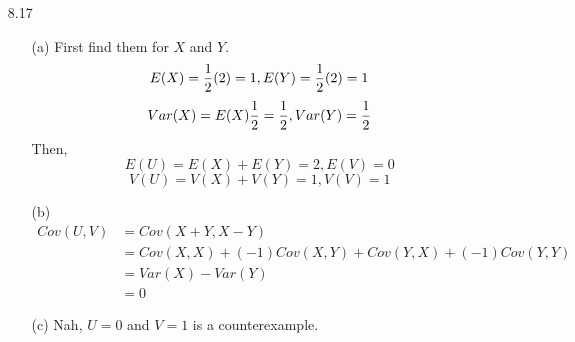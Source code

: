 \documentclass[english, 11pt]{article}
\begin{document}
\begin{itemize}
  \item[8.17]
  \begin{itemize}
    \item[(a)] First find them for $X$ and $Y$.
    \[ E(X) = \frac{1}{2}(2) = 1,  E(Y) = \frac{1}{2}(2) = 1\]
    \[ Var(X) = E(X)\frac{1}{2} = \frac{1}{2}, Var(Y) = \frac{1}{2} \]
    Then,
    \[ E(U) = E(X) + E(Y) = 2, E(V) = 0 \]
    \[ V(U) = V(X) + V(Y) = 1, V(V) = 1 \]
    \item[(b)]
    \begin{align*}
      Cov(U,V) & = Cov(X+Y, X-Y) \\
               & = Cov(X,X) + (-1)Cov(X, Y) + Cov(Y,X) + (-1)Cov(Y,Y) \\
               & = Var(X) - Var(Y) \\
               & = 0
    \end{align*}
    \item[(c)]
    Nah, $U = 0$ and $V = 1$ is a counterexample.
  \end{itemize}


\end{itemize}
\end{document}
